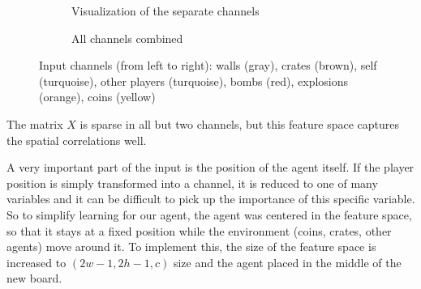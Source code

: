 \begin{figure}
  \centering
  \begin{subfigure}[b]{0.6\textwidth}
    \centering
    \usebox{\largestimage}
    \caption{Visualization of the separate channels}
  \end{subfigure}
  \quad
  \begin{subfigure}[b]{0.36\textwidth}
    \centering
    \caption{All channels combined}
  \end{subfigure}
  \caption{Input channels (from left to right): walls (gray), crates (brown), self (turquoise), other players (turquoise), bombs (red), explosions (orange), coins (yellow)}
  \label{fig:input-channels}
\end{figure}

The matrix $X$ is sparse in all but two channels, but this feature space captures the spatial correlations well.

A very important part of the input is the position of the agent itself. If the player position is simply transformed into a channel, it is reduced to one of many variables and it can be difficult to pick up the importance of this specific variable. So to simplify learning for our agent, the agent was centered in the feature space, so that it stays at a fixed position while the environment (coins, crates, other agents) move around it. To implement this, the size of the feature space is increased to $(2w-1, 2h-1, c)$ size and the agent placed in the middle of the new board.
